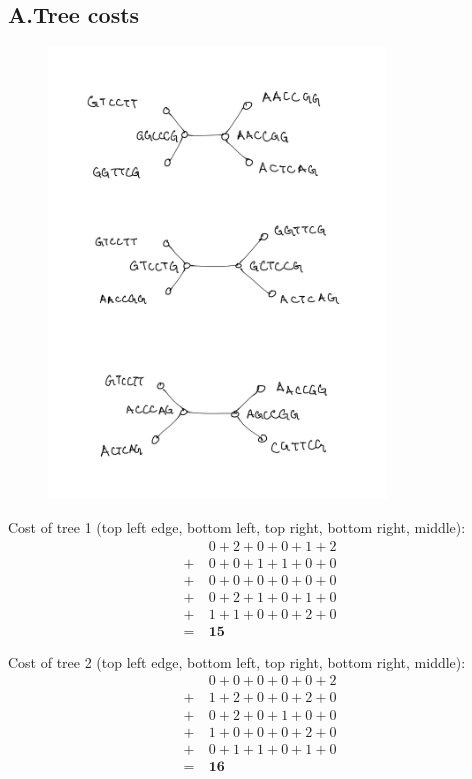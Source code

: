 \documentclass{article}[11pt]
\begin{document}
\subsection*{A.\quad Tree costs}
\begin{figure}[H]
    \includegraphics[width=0.8\textwidth]{problem2/a.png}
\end{figure}

Cost of tree 1 (top left edge, bottom left, top right, bottom right, middle):
\begin{align*}
     &  0 + 2 + 0 + 0 + 1 + 2 \\
   + \ &  0 + 0 + 1 + 1 + 0 + 0 \\
   + \ &  0 + 0 + 0 + 0 + 0 + 0 \\
   + \ &  0 + 2 + 1 + 0 + 1 + 0 \\
   + \ &  1 + 1 + 0 + 0 + 2 + 0 \\
   = \ & \mathbf{15}
\end{align*}

Cost of tree 2 (top left edge, bottom left, top right, bottom right, middle):
\begin{align*}
     &  0 + 0 + 0 + 0 + 0 + 2 \\
   + \ &  1 + 2 + 0 + 0 + 2 + 0 \\
   + \ &  0 + 2 + 0 + 1 + 0 + 0 \\
   + \ &  1 + 0 + 0 + 0 + 2 + 0 \\
   + \ &  0 + 1 + 1 + 0 + 1 + 0 \\
   = \ & \mathbf{16}
\end{align*}
\end{document}
